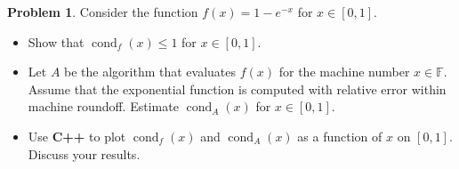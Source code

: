 \documentclass[a4paper]{book}
\numberwithin{equation}{chapter}
\theoremstyle{definition}
\newtheorem{pro}[exm]{Problem}
\begin{document}
\begin{pro}
  Consider the function $f(x) = 1 - e^{-x}$ for $x \in [0,1]$.
  \begin{itemize}
  \item Show that $\operatorname{cond}_f(x) \leq 1$ for $x \in [0,1]$.

  \item Let $A$ be the algorithm that evaluates $f(x)$ for the machine number $x \in \mathbb{F}$. Assume that the exponential function is computed with relative error within machine roundoff. Estimate $\operatorname{cond}_A(x)$ for $x \in [0,1]$.

    \item Use \textbf{C++} to plot $\operatorname{cond}_f(x)$ and $\operatorname{cond}_A(x)$ as a function of $x$ on $[0,1]$. Discuss your results.
  \end{itemize}
\end{pro}
\end{document}
